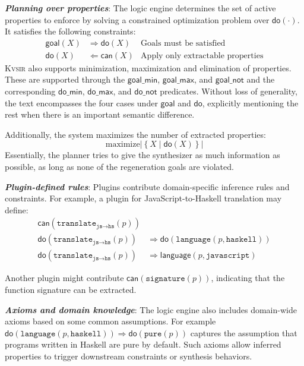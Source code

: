 \documentclass[sigplan]{acmart}
\newcommand{\sys}{{\scshape Kv{\textalpha}sir}\xspace}
\newcommand{\heading}[1]{\vspace{2pt}\noindent\textbf{\emph{#1}}:\enspace}
\begin{document}
\heading{Planning over properties}
The logic engine determines the set of active properties to enforce by solving a constrained optimization problem over $\mathsf{do}(\cdot)$. It satisfies the following constraints:
\begin{align*}
  \mathsf{goal}(X) &\Rightarrow \mathsf{do}(X) &\text{Goals must be satisfied} \\
  \mathsf{do}(X) &\Leftarrow \mathsf{can}(X) &\text{Apply only extractable properties}
\end{align*}
\sys also supports minimization, maximization and elimination of properties.
These are supported through the $\mathsf{goal\_min}$, $\mathsf{goal\_max}$, and $\mathsf{goal\_not}$ and the corresponding $\mathsf{do\_min}$, $\mathsf{do\_max}$, and $\mathsf{do\_not}$ predicates.
Without loss of generality, the text encompasses the four cases under $\mathsf{goal}$ and $\mathsf{do}$, explicitly mentioning the rest when there is an important semantic difference.

Additionally, the system maximizes the number of extracted properties:
\[
\text{maximize} \left|\left\{ X \mid \mathsf{do}(X) \right\}\right|
\]
Essentially, the planner tries to give the synthesizer as much information
as possible, as long as none of the regeneration goals are violated.

\heading{Plugin-defined rules}
Plugins contribute domain-specific inference rules and constraints. For example, a plugin for JavaScript-to-Haskell translation may define:
\begin{align*}
\mathsf{can}(\texttt{translate}_{\texttt{js} \rightarrow \texttt{hs}}(p)) & \\
\mathsf{do}(\texttt{translate}_{\texttt{js} \rightarrow \texttt{hs}}(p)) &\Rightarrow \mathsf{do}(\texttt{language}(p, \texttt{haskell})) \\
\mathsf{do}(\texttt{translate}_{\texttt{js} \rightarrow \texttt{hs}}(p)) &\Rightarrow \mathsf{language}(p, \texttt{javascript})
\end{align*}

Another plugin might contribute $\mathsf{can}(\texttt{signature}(p))$, indicating that the function signature can be extracted.

\heading{Axioms and domain knowledge}
The logic engine also includes domain-wide axioms based on some common assumptions.
For example
$\mathsf{do}(\texttt{language}(p, \texttt{haskell})) \Rightarrow \mathsf{do}(\texttt{pure}(p))$
captures the assumption that programs written in Haskell are pure by default.
Such axioms allow inferred properties to trigger downstream constraints or synthesis behaviors.
\end{document}
